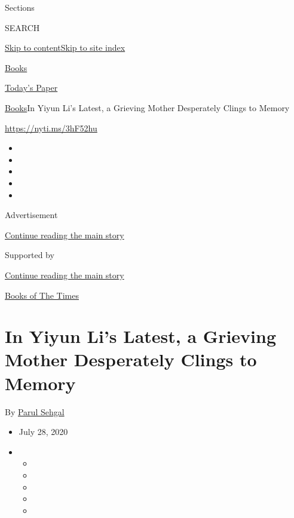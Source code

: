 Sections

SEARCH

\protect\hyperlink{site-content}{Skip to
content}\protect\hyperlink{site-index}{Skip to site index}

\href{https://www.nytimes.com/section/books}{Books}

\href{https://myaccount.nytimes.com/auth/login?response_type=cookie\&client_id=vi}{}

\href{https://www.nytimes.com/section/todayspaper}{Today's Paper}

\href{/section/books}{Books}\textbar{}In Yiyun Li's Latest, a Grieving
Mother Desperately Clings to Memory

\url{https://nyti.ms/3hF52hu}

\begin{itemize}
\item
\item
\item
\item
\item
\end{itemize}

Advertisement

\protect\hyperlink{after-top}{Continue reading the main story}

Supported by

\protect\hyperlink{after-sponsor}{Continue reading the main story}

\href{/column/books-of-the-times}{Books of The Times}

\hypertarget{in-yiyun-lis-latest-a-grieving-mother-desperately-clings-to-memory}{%
\section{In Yiyun Li's Latest, a Grieving Mother Desperately Clings to
Memory}\label{in-yiyun-lis-latest-a-grieving-mother-desperately-clings-to-memory}}

By \href{https://www.nytimes.com/by/parul-sehgal}{Parul Sehgal}

\begin{itemize}
\item
  July 28, 2020
\item
  \begin{itemize}
  \item
  \item
  \item
  \item
  \item
  \end{itemize}
\end{itemize}

